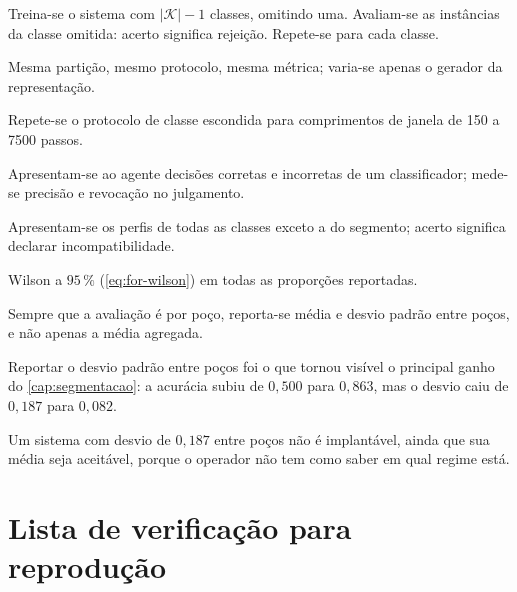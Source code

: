 \begin{description}[leftmargin=0pt,style=nextline,itemsep=0.4em]

\item[Classe escondida (\cref{cap:closedworld}).] Treina-se o sistema com $|\mathcal{K}|
- 1$ classes, omitindo uma. Avaliam-se as instâncias da classe omitida: acerto significa
rejeição. Repete-se para cada classe.

\item[Comparação de arquiteturas (\cref{cap:mundoaberto}).] Mesma partição, mesmo
protocolo, mesma métrica; varia-se apenas o gerador da representação.

\item[Varredura de janela (\cref{cap:closedworld}).] Repete-se o protocolo de classe
escondida para comprimentos de janela de 150 a 7500 passos.

\item[Validação (\cref{cap:resultados-agente}).] Apresentam-se ao agente decisões
corretas e incorretas de um classificador; mede-se precisão e revocação no julgamento.

\item[Novidade com agente (\cref{cap:resultados-agente}).] Apresentam-se os perfis de
todas as classes exceto a do segmento; acerto significa declarar incompatibilidade.

\item[Intervalos de confiança.] Wilson a $95\,\%$ (\cref{eq:for-wilson}) em todas as
proporções reportadas.

\item[Desvio entre poços.] Sempre que a avaliação é por poço, reporta-se média e desvio
padrão entre poços, e não apenas a média agregada.

\end{description}

\begin{destaque}
Reportar o desvio padrão entre poços foi o que tornou visível o principal ganho do
\cref{cap:segmentacao}: a acurácia subiu de $0{,}500$ para $0{,}863$, mas o desvio caiu
de $0{,}187$ para $0{,}082$.

Um sistema com desvio de $0{,}187$ entre poços não é implantável, ainda que sua média
seja aceitável, porque o operador não tem como saber em qual regime está.
\end{destaque}

\section{Lista de verificação para reprodução}

